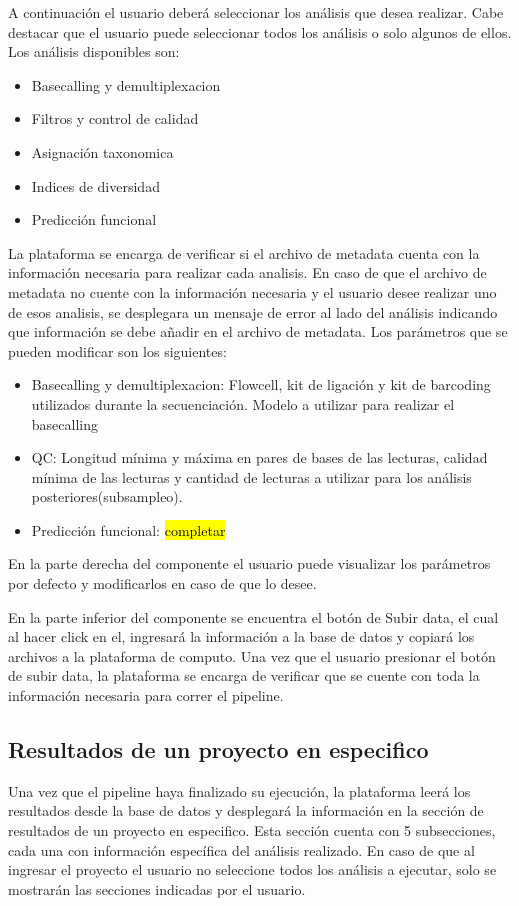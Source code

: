 A continuación el usuario deberá seleccionar los análisis que desea realizar. Cabe destacar que el usuario puede seleccionar todos los análisis o solo algunos de ellos. Los análisis disponibles son:
\begin{itemize}
    \item Basecalling y demultiplexacion
    \item Filtros y control de calidad
    \item Asignación taxonomica
    \item Indices de diversidad
    \item Predicción funcional
\end{itemize}

La plataforma se encarga de verificar si el archivo de metadata cuenta con la información necesaria para realizar cada analisis. En caso de que el archivo de metadata no cuente con la información necesaria y el usuario desee realizar uno de esos analisis, se desplegara un mensaje de error al lado del análisis indicando que información se debe añadir en el archivo de metadata. Los parámetros que se pueden modificar son los siguientes:
\begin{itemize}
    \item Basecalling y demultiplexacion: Flowcell, kit de ligación y kit de barcoding utilizados durante la secuenciación. Modelo a utilizar para realizar el basecalling
    \item QC: Longitud mínima y máxima en pares de bases de las lecturas, calidad mínima de las lecturas y cantidad de lecturas a utilizar para los análisis posteriores(subsampleo).
    \item Predicción funcional: \hl{completar}
\end{itemize}

En la parte derecha del componente el usuario puede visualizar los parámetros por defecto y modificarlos en caso de que lo desee. 


En la parte inferior del componente se encuentra el botón de Subir data, el cual al hacer click en el, ingresará la información a la base de datos y copiará los archivos a la plataforma de computo. Una vez que el usuario presionar el botón de subir data, la plataforma se encarga de verificar que se cuente con toda la información necesaria para correr el pipeline.
\subsection{Resultados de un proyecto en especifico}
Una vez que el pipeline haya finalizado su ejecución, la plataforma leerá los resultados desde la base de datos y desplegará la información en la sección de resultados de un proyecto en especifico. Esta sección cuenta con 5 subsecciones, cada una con información específica del análisis realizado. En caso de que al ingresar el proyecto el usuario no seleccione todos los análisis a ejecutar, solo se mostrarán las secciones indicadas por el usuario.

